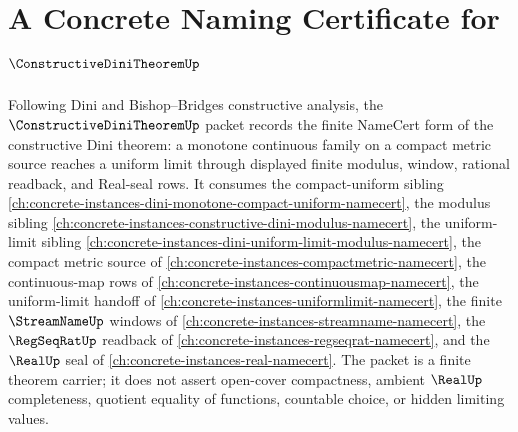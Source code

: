 \chapter{A Concrete Naming Certificate for $\ConstructiveDiniTheoremUp$}
\label{ch:concrete-instances-constructive-dini-theorem-namecert}

Following Dini and Bishop--Bridges constructive analysis, the $\ConstructiveDiniTheoremUp$ packet records the finite NameCert form of the constructive Dini theorem: a monotone continuous family on a compact metric source reaches a uniform limit through displayed finite modulus, window, rational readback, and Real-seal rows. It consumes the compact-uniform sibling \autoref{ch:concrete-instances-dini-monotone-compact-uniform-namecert}, the modulus sibling \autoref{ch:concrete-instances-constructive-dini-modulus-namecert}, the uniform-limit sibling \autoref{ch:concrete-instances-dini-uniform-limit-modulus-namecert}, the compact metric source of \autoref{ch:concrete-instances-compactmetric-namecert}, the continuous-map rows of \autoref{ch:concrete-instances-continuousmap-namecert}, the uniform-limit handoff of \autoref{ch:concrete-instances-uniformlimit-namecert}, the finite $\StreamNameUp$ windows of \autoref{ch:concrete-instances-streamname-namecert}, the $\RegSeqRatUp$ readback of \autoref{ch:concrete-instances-regseqrat-namecert}, and the $\RealUp$ seal of \autoref{ch:concrete-instances-real-namecert}. The packet is a finite theorem carrier; it does not assert open-cover compactness, ambient $\RealUp$ completeness, quotient equality of functions, countable choice, or hidden limiting values.

